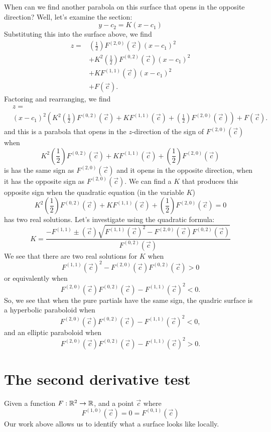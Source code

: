 \documentclass{ximera}
\begin{document}
When can we find another parabola on this surface that opens in the
opposite direction? Well, let's examine the section:
\[
y -c_2 = K (x-c_1)
\]
Substituting this into the surface above, we find
\begin{align*}
  z = &\left(\frac{1}{2}\right)F^{(2,0)}(\vec{c})(x-c_1)^2\\
  &+ K^2 \left(\frac{1}{2}\right)F^{(0,2)}(\vec{c})(x-c_1)^2\\
  &+ K F^{(1,1)}(\vec{c}) (x-c_1)^2 \\
  &+ F(\vec{c}).
\end{align*}
Factoring and rearranging, we find 
\begin{align*}
&z = \\
&(x-c_1)^2 \left(
K^2 \left(\frac{1}{2}\right)F^{(0,2)}(\vec{c}) + K F^{(1,1)}(\vec{c}) + \left(\frac{1}{2}\right)F^{(2,0)}(\vec{c})
\right)+ F(\vec{c}).
\end{align*}
and this is a parabola that opens in the $z$-direction of the sign of
$F^{(2,0)}(\vec{c})$ when
\[
K^2 \left(\frac{1}{2}\right)F^{(0,2)}(\vec{c}) + K F^{(1,1)}(\vec{c}) + \left(\frac{1}{2}\right)F^{(2,0)}(\vec{c})
\]
is has the same sign as $F^{(2,0)}(\vec{c})$ and it opens in the
opposite direction, when it has the opposite sign as
$F^{(2,0)}(\vec{c})$.  We can find a $K$ that produces this opposite
sign when the quadratic equation (in the variable $K$)
\[
K^2 \left(\frac{1}{2}\right)F^{(0,2)}(\vec{c}) + K F^{(1,1)}(\vec{c}) + \left(\frac{1}{2}\right)F^{(2,0)}(\vec{c}) = 0
\]
has two real solutions. Let's investigate using the quadratic formula:
\[
K = \frac{- F^{(1,1)}\pm(\vec{c})\sqrt{F^{(1,1)}(\vec{c})^2-F^{(2,0)}(\vec{c})F^{(0,2)}(\vec{c})}}{F^{(0,2)}(\vec{c})}
\]
We see that there are two real solutions for $K$ when
\[
F^{(1,1)}(\vec{c})^2-F^{(2,0)}(\vec{c})F^{(0,2)}(\vec{c})>0
\]
or equivalently when
\[
F^{(2,0)}(\vec{c})F^{(0,2)}(\vec{c})-F^{(1,1)}(\vec{c})^2<0.
\]
So, we see that when the pure partials have the same sign, the quadric
surface is a hyperbolic paraboloid when
\[
F^{(2,0)}(\vec{c})F^{(0,2)}(\vec{c})-F^{(1,1)}(\vec{c})^2<0,
\]
and an elliptic paraboloid when 
\[
F^{(2,0)}(\vec{c})F^{(0,2)}(\vec{c})-F^{(1,1)}(\vec{c})^2>0.
\]

\section{The second derivative test}

Given a function $F:\mathbb R^2\to \mathbb R$, and a point $\vec{c}$ where
\[
F^{(1,0)}(\vec{c}) = 0 = F^{(0,1)}(\vec{c}) 
\]
Our work above allows us to identify what a surface looks like locally.
\end{document}
